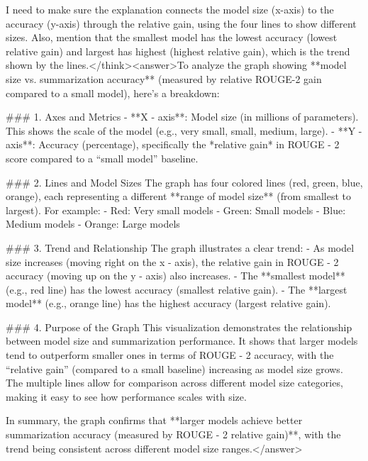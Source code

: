 I need to make sure the explanation connects the model size (x-axis) to the accuracy (y-axis) through the relative gain, using the four lines to show different sizes. Also, mention that the smallest model has the lowest accuracy (lowest relative gain) and largest has highest (highest relative gain), which is the trend shown by the lines.</think><answer>To analyze the graph showing **model size vs. summarization accuracy** (measured by relative ROUGE-2 gain compared to a small model), here’s a breakdown:  


### 1. Axes and Metrics  
- **X - axis**: Model size (in millions of parameters). This shows the scale of the model (e.g., very small, small, medium, large).  
- **Y - axis**: Accuracy (percentage), specifically the *relative gain* in ROUGE - 2 score compared to a “small model” baseline.  


### 2. Lines and Model Sizes  
The graph has four colored lines (red, green, blue, orange), each representing a different **range of model size** (from smallest to largest). For example:  
- Red: Very small models  
- Green: Small models  
- Blue: Medium models  
- Orange: Large models  


### 3. Trend and Relationship  
The graph illustrates a clear trend:  
- As model size increases (moving right on the x - axis), the relative gain in ROUGE - 2 accuracy (moving up on the y - axis) also increases.  
- The **smallest model** (e.g., red line) has the lowest accuracy (smallest relative gain).  
- The **largest model** (e.g., orange line) has the highest accuracy (largest relative gain).  


### 4. Purpose of the Graph  
This visualization demonstrates the relationship between model size and summarization performance. It shows that larger models tend to outperform smaller ones in terms of ROUGE - 2 accuracy, with the “relative gain” (compared to a small baseline) increasing as model size grows. The multiple lines allow for comparison across different model size categories, making it easy to see how performance scales with size.  


In summary, the graph confirms that **larger models achieve better summarization accuracy (measured by ROUGE - 2 relative gain)**, with the trend being consistent across different model size ranges.</answer>
